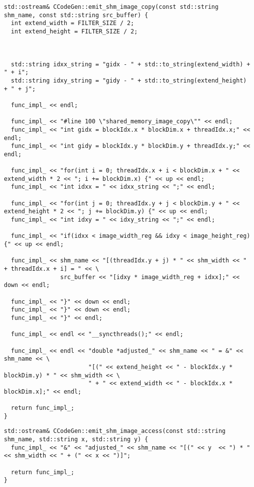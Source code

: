 \documentclass{article}
\begin{document}
\begin{verbatim}
std::ostream& CCodeGen::emit_shm_image_copy(const std::string shm_name, const std::string src_buffer) {
  int extend_width = FILTER_SIZE / 2;
  int extend_height = FILTER_SIZE / 2;



  std::string idxx_string = "gidx - " + std::to_string(extend_width) + " + i";
  std::string idxy_string = "gidy - " + std::to_string(extend_height) + " + j";

  func_impl_ << endl;

  func_impl_ << "#line 100 \"shared_memory_image_copy\"" << endl;
  func_impl_ << "int gidx = blockIdx.x * blockDim.x + threadIdx.x;" << endl;
  func_impl_ << "int gidy = blockIdx.y * blockDim.y + threadIdx.y;" << endl;

  func_impl_ << "for(int i = 0; threadIdx.x + i < blockDim.x + " << extend_width * 2 << "; i += blockDim.x) {" << up << endl;
  func_impl_ << "int idxx = " << idxx_string << ";" << endl;

  func_impl_ << "for(int j = 0; threadIdx.y + j < blockDim.y + " << extend_height * 2 << "; j += blockDim.y) {" << up << endl;
  func_impl_ << "int idxy = " << idxy_string << ";" << endl;

  func_impl_ << "if(idxx < image_width_reg && idxy < image_height_reg) {" << up << endl;

  func_impl_ << shm_name << "[(threadIdx.y + j) * " << shm_width << " + threadIdx.x + i] = " << \
                src_buffer << "[idxy * image_width_reg + idxx];" << down << endl;

  func_impl_ << "}" << down << endl;
  func_impl_ << "}" << down << endl;
  func_impl_ << "}" << endl;

  func_impl_ << endl << "__syncthreads();" << endl;

  func_impl_ << endl << "double *adjusted_" << shm_name << " = &" << shm_name << \
                        "[(" << extend_height << " - blockIdx.y * blockDim.y) * " << shm_width << \
                        " + " << extend_width << " - blockIdx.x * blockDim.x];" << endl;

  return func_impl_;
}
\end{verbatim}

\begin{verbatim}
std::ostream& CCodeGen::emit_shm_image_access(const std::string shm_name, std::string x, std::string y) {
  func_impl_ << "&" << "adjusted_" << shm_name << "[(" << y  << ") * " << shm_width << " + (" << x << ")]";

  return func_impl_;
}
\end{verbatim}
\end{document}
